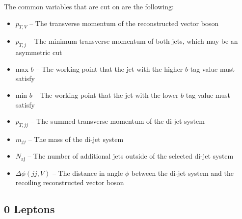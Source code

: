 The common variables that are cut on are the following:
\begin{itemize}
\item $p_{T,V}$ -- The transverse momentum of the reconstructed vector boson
\item $p_{T,j}$ -- The minimum transverse momentum of both jets,
  which may be an asymmetric cut
\item max $b$ -- The working point that the jet with the higher $b$-tag value must satisfy
\item min $b$ -- The working point that the jet with the lower $b$-tag value must satisfy
\item $p_{T,jj}$ -- The summed transverse momentum of the di-jet system
\item $m_{jj}$ -- The mass of the di-jet system
\item $N_\textrm{aj}$ -- The number of additional jets outside of the selected di-jet system
\item $\Delta\phi(jj, V)$ -- The distance in angle $\phi$ between the di-jet system
  and the recoiling reconstructed vector boson
\end{itemize}

\subsection{0 Leptons} \label{sec:resolved-0}

